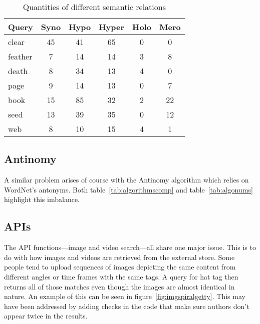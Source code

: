 \begin{table}[!htbp]
\centering
\caption[Quantities of different semantic relations]{Quantities of different semantic relations}
\label{tab:semnum}
\begin{tabu}{lccccc}
\toprule
\textbf{Query} & \textbf{Syno} & \textbf{Hypo} & \textbf{Hyper} & \textbf{Holo} & \textbf{Mero} \\ \midrule
clear   & 45   & 41   & 65    & 0    & 0    \\
feather & 7    & 14   & 14    & 3    & 8    \\
death   & 8    & 34   & 13    & 4    & 0    \\
page    & 9    & 14   & 13    & 0    & 7    \\
book    & 15   & 85   & 32    & 2    & 22   \\
seed    & 13   & 39   & 35    & 0    & 12   \\
web     & 8    & 10   & 15    & 4    & 1    \\ \bottomrule
\end{tabu}
\end{table}


\subsection{Antinomy}

A similar problem arises of course with the Antinomy algorithm which relies on WordNet's antonyms. Both table~\ref{tab:algorithmscomp} and table~\ref{tab:algonums} highlight this imbalance.


\subsection{APIs}
\label{s:apis}

The \ac{API} functions---image and video search---all share one major issue. This is to do with how images and videos are retrieved from the external store. Some people tend to upload sequences of images depicting the same content from different angles or time frames with the same tags. A query for hat tag then returns all of those matches even though the images are almost identical in nature. An example of this can be seen in figure~\ref{fig:imgspiralgetty}. This may have been addressed by adding checks in the code that make sure authors don't appear twice in the results.

